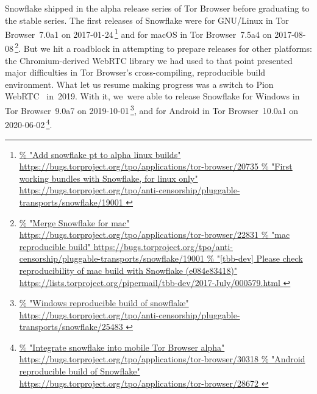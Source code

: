 \documentclass[letterpaper,twocolumn]{article}
\newlength{\urlfootnotesize}
\newcommand{\urlfootnote}[1]{\footnote{
\raggedright\fontsize{\urlfootnotesize}{\urlfootnotesize}\selectfont\url{#1}
}}
\begin{document}
Snowflake shipped in the alpha release series of Tor Browser
before graduating to the stable series.
The first releases of Snowflake were
for GNU/Linux
in Tor Browser~7.0a1 on \mbox{2017-01-24}\,\urlfootnote{
https://bugs.torproject.org/tpo/applications/tor-browser/20735
}
and for macOS
in Tor Browser~7.5a4 on \mbox{2017-08-08}\,\urlfootnote{
https://bugs.torproject.org/tpo/applications/tor-browser/22831
}.
But we hit a roadblock in attempting to prepare releases for other platforms:
the Chromium-derived WebRTC library we had used to that point
presented major difficulties
in Tor Browser's
cross-compiling, reproducible build environment.
What let us resume making progress was a switch to
Pion WebRTC~\cite{pion-webrtc} in~2019.
With it, we~were able to release
Snowflake for Windows
in Tor Browser~9.0a7 on \mbox{2019-10-01}\,\urlfootnote{
https://bugs.torproject.org/tpo/anti-censorship/pluggable-transports/snowflake/25483
},
and for Android in
Tor Browser~10.0a1 on \mbox{2020-06-02}\,\urlfootnote{
https://bugs.torproject.org/tpo/applications/tor-browser/30318
}.
\end{document}
